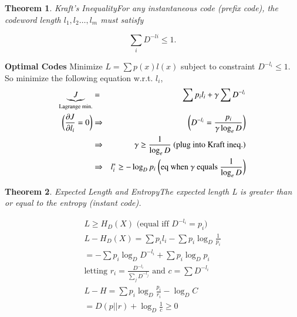\documentclass[10pt]{article}
\newtheorem{thm}{Theorem}[section]
\begin{document}
\begin{tiny}
\begin{multicols}{3}
\begin{thm}{Kraft's Inequality}\label{thm: kraft}
For any instantaneous code (prefix code), the codeword length $l_1,l_2 \ldots , l_m$ must satisfy
\end{thm}

\begin{equation}
\sum_i D^{-li}  \leq 1.
\end{equation}

\textbf{\scriptsize{Optimal Codes}}
Minimize $L = \sum p(x) l(x)$ subject to constraint $D^{-l_i} \leq 1$. So minimize the following equation w.r.t. $l_i$,
\begin{align*}
\underbrace{J}_\text{Lagrange min.} &=& \sum {p_i}{l_i} + \gamma \sum D^{-l_i} \label{defn: lagrange} \\
\bigg(\frac{\partial J}{\partial l_i} = 0\bigg) &\Rightarrow& \bigg(D^{-l_i} = \frac{p_i}{\gamma \log_e D}\bigg) \\
&\Rightarrow& \gamma \ge \frac{1}{\log_e D} \text{ (plug into Kraft ineq.)} \\
&\Rightarrow& l_i^* \geq - \log_D p_i \text{ \bigg(eq when $\gamma$ equals $\frac{1}{\log_e D}$\bigg)}
\end{align*}

\begin{thm}{Expected Length and Entropy}\label{thm: codewordentropy}
The expected length L is greater than or equal to the entropy (instant code).
\end{thm}

\begin{eqnarray}
L \geq H_D(X) \text{ (equal iff } D^{-l_i} = p_i \text{)} \\
L - H_D(X) = \sum {p_i}{l_i} - \sum {p_i} \log_D \frac {1}{p_i}\\
= - \sum {p_i} \log_D D^{-l_i} + \sum {p_i} \log_D {p_i} \\
\text{letting } {r_i} = \frac {D^{-l_i}}{\sum_j D^{-l_j}} \text{ and } c = \sum D^{-l_i} \\
L - H = \sum {p_i} \log_D \frac {p_i}{r_i} - \log_D C \\
= D(p||r) + \log_D \frac {1}{c} \geq 0 
\end{eqnarray}





\end{multicols}
\end{tiny}
\end{document}
